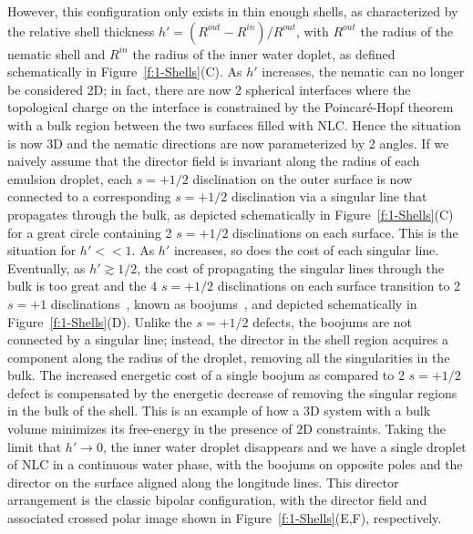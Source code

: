 However, this configuration only exists in thin enough shells, as characterized by the relative shell thickness $h' = (R^{out}-R^{in})/R^{out}$, with $R^{out}$ the radius of the nematic shell and $R^{in}$ the radius of the inner water doplet, as defined schematically in Figure~\ref{f:1-Shells}(C).
As $h'$ increases, the nematic can no longer be considered 2D; in fact, there are now 2 spherical interfaces where the topological charge on the interface is constrained by the Poincar\'e-Hopf theorem with a bulk region between the two surfaces filled with NLC.
Hence the situation is now 3D and the nematic directions are now parameterized by 2 angles.
If we naively assume that the director field is invariant along the radius of each emulsion droplet, each $s = +1/2$ disclination on the outer surface is now connected to a corresponding $s = +1/2$ disclination via a singular line that propagates through the bulk, as depicted schematically in Figure~\ref{f:1-Shells}(C) for a great circle containing 2 $s = +1/2$ disclinations on each surface.
This is the situation for $h'<<1$.
As $h'$ increases, so does the cost of each singular line.
Eventually, as $h'\gtrsim 1/2$, the cost of propagating the singular lines through the bulk is too great and the 4 $s = +1/2$ disclinations on each surface transition to 2 $s = +1$ disclinations~\cite{RN105}, known as boojums~\cite{RN273}, and depicted schematically in Figure~\ref{f:1-Shells}(D).
Unlike the $s = +1/2$ defects, the boojums are not connected by a singular line; instead, the director in the shell region acquires a component along the radius of the droplet, removing all the singularities in the bulk.
The increased energetic cost of a single boojum as compared to 2 $s = +1/2$ defect is compensated by the energetic decrease of removing the singular regions in the bulk of the shell.
This is an example of how a 3D system with a bulk volume minimizes its free-energy in the presence of 2D constraints.
Taking the limit that $h' \rightarrow 0$, the inner water droplet disappears and we have a single droplet of NLC in a continuous water phase, with the boojums on opposite poles and the director on the surface aligned along the longitude lines.
This director arrangement is the classic bipolar configuration, with the director field and associated crossed polar image shown in Figure~\ref{f:1-Shells}(E,F), respectively.

